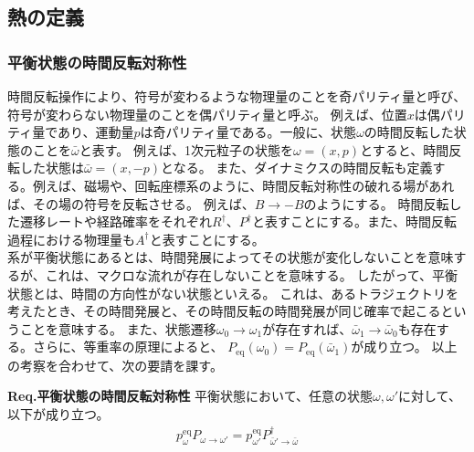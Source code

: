 \documentclass[a4paper,11pt]{jsarticle}
\numberwithin{equation}{section}
\begin{document}
\newpage
\subsection{熱の定義}
\subsubsection{平衡状態の時間反転対称性}
時間反転操作により、符号が変わるような物理量のことを奇パリティ量と呼び、符号が変わらない物理量のことを偶パリティ量と呼ぶ。
例えば、位置$x$は偶パリティ量であり、運動量$p$は奇パリティ量である。一般に、状態$\omega$の時間反転した状態のことを$\bar{\omega}$と表す。
例えば、1次元粒子の状態を$\omega = (x,p)$とすると、時間反転した状態は$\bar{\omega} = (x,-p)$となる。
また、ダイナミクスの時間反転も定義する。例えば、磁場や、回転座標系のように、時間反転対称性の破れる場があれば、その場の符号を反転させる。
例えば、$B \to -B$のようにする。
時間反転した遷移レートや経路確率をそれぞれ$R^{\dagger}$、$P^{\dagger}$と表すことにする。また、時間反転過程における物理量も$A^{\dagger}$と表すことにする。\\

系が平衡状態にあるとは、時間発展によってその状態が変化しないことを意味するが、これは、マクロな流れが存在しないことを意味する。
したがって、平衡状態とは、時間の方向性がない状態といえる。
これは、あるトラジェクトリを考えたとき、その時間発展と、その時間反転の時間発展が同じ確率で起こるということを意味する。
また、状態遷移$\omega_0 \to \omega_1$が存在すれば、$\bar{\omega}_1 \to \bar{\omega}_0$も存在する。さらに、等重率の原理によると、
$P_{\text{eq}}(\omega_0) = P_{\text{eq}}(\bar{\omega}_1)$が成り立つ。
以上の考察を合わせて、次の要請を課す。

\begin{itembox}[l]{\textbf{Req.平衡状態の時間反転対称性}}
    平衡状態において、任意の状態$\omega,\omega'$に対して、以下が成り立つ。
    \begin{align}
        p_{\omega}^{\text{eq}} P_{\omega \to \omega'} = p_{\omega'}^{\text{eq}} P^{\dagger}_{\bar{\omega}' \to \bar{\omega}}
    \end{align}

\end{itembox}
\end{document}
